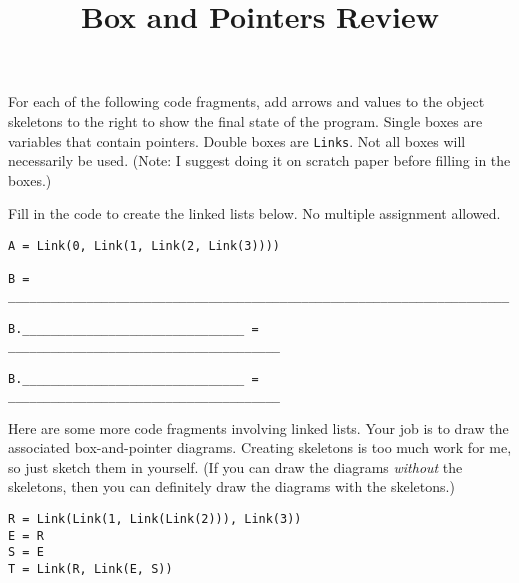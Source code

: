 \documentclass[twoside]{article}
\title{\sc Box and Pointers Review}
\newcommand{\solutionimage}[2]{#2} %
\newcommand{\solutionimage}[2]{#1} %
\begin{document}
\thispagestyle{empty}
\maketitle

\begin{enumerate}

For each of the following code fragments, add arrows and values to the object skeletons to the right to show the final state of the program.  Single boxes are variables that contain pointers.  Double boxes are \lstinline/Links/. Not all boxes will necessarily be used. (Note: I suggest doing it on scratch paper before filling in the boxes.)

\vspace{0.2in}

\solutionimage{}{}

\vspace{0.2in}

Fill in the code to create the linked lists below. No multiple assignment allowed.

\vspace{0.2in}



\vspace{0.2in}

\begin{lstlisting}
A = Link(0, Link(1, Link(2, Link(3))))

B = ______________________________________________________________________

B._______________________________ = ______________________________________

B._______________________________ = ______________________________________
\end{lstlisting}


Here are some more code fragments involving linked lists. Your job is to draw the associated box-and-pointer diagrams. Creating skeletons is too much work for me, so just sketch them in yourself. (If you can draw the diagrams \textit{without} the skeletons, then you can definitely draw the diagrams with the skeletons.)

\begin{verbatim}
R = Link(Link(1, Link(Link(2))), Link(3))
E = R
S = E
T = Link(R, Link(E, S))
\end{verbatim}


\end{enumerate}
\end{document}
